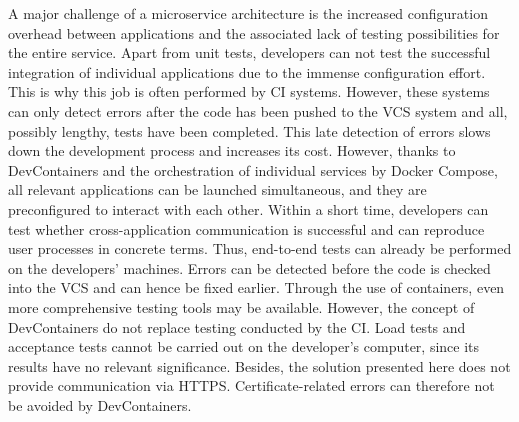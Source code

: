         A major challenge of a microservice architecture is the increased configuration overhead between applications and the associated lack of testing possibilities for the entire service. Apart from unit tests, developers can not test the successful integration of individual applications due to the immense configuration effort. This is why this job is often performed by \ac{CI} systems. However, these systems can only detect errors after the code has been pushed to the \ac{VCS} system and all, possibly lengthy, tests have been completed. This late detection of errors slows down the development process and increases its cost.\newline
        However, thanks to DevContainers and the orchestration of individual services by Docker Compose, all relevant applications can be launched simultaneous, and they are preconfigured to interact with each other. Within a short time, developers can test whether cross-application communication is successful and can reproduce user processes in concrete terms. Thus, end-to-end tests can already be performed on the developers' machines. Errors can be detected before the code is checked into the \ac{VCS} and can hence be fixed earlier. Through the use of containers, even more comprehensive testing tools may be available.\newline
        However, the concept of DevContainers do not replace testing conducted by the \ac{CI}. Load tests and acceptance tests cannot be carried out on the developer's computer, since its results have no relevant significance. Besides, the solution presented here does not provide communication via HTTPS. Certificate-related errors can therefore not be avoided by DevContainers.

